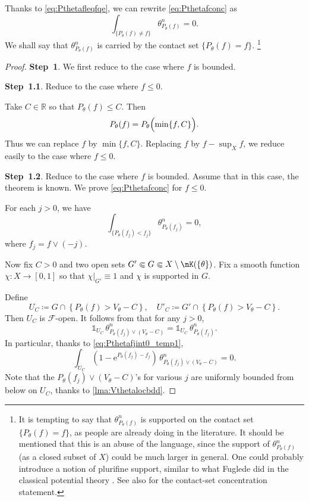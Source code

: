 Thanks to \eqref{eq:Pthetafleqfqe}, we can rewrite \eqref{eq:Pthetafconc} as
\[
\int_{\{P_{\theta}(f)\neq f\}} \theta_{P_{\theta}(f)}^n=0.
\]
We shall say that $\theta_{P_{\theta}(f)}^n$ is carried by the contact set $\{P_{\theta}(f)=f\}$.
\footnote{It is tempting to say that $\theta_{P_{\theta}(f)}^n$ is supported on the contact set $\{P_{\theta}(f)=f\}$, as people are already doing in the literature. It should be mentioned that this is an abuse of the language, since the support of $\theta_{P_{\theta}(f)}^n$ (as a closed subset of $X$) could be much larger in general. One could probably introduce a notion of plurifine support, similar to what Fuglede did in the classical potential theory \cite{Fug72}. See also \cite[Theorem~16.2.5]{FPT} for the contact-set concentration statement.}


\begin{proof}
    \textbf{Step~1}. We first reduce to the case where $f$ is bounded.

    \textbf{Step~1.1}. Reduce to the case where $f\leq 0$.

    Take $C\in \mathbb{R}$ so that $P_{\theta}(f)\leq C$. Then
    \[
    P_{\theta}(f)=P_{\theta}\Bigl( \min\{f,C\} \Bigr).
    \]
    Thus we can replace $f$ by $\min \{f,C\}$. Replacing $f$ by $f-\sup_X f$, we reduce easily to the case where $f\leq 0$.

    \textbf{Step~1.2}. Reduce to the case where $f$ is bounded. Assume that in this case, the theorem is known. We prove \eqref{eq:Pthetafconc} for $f\leq 0$.

    For each $j>0$, we have
    \begin{equation}\label{eq:Pthetafjint0_temp1}
    \int_{\{P_{\theta}(f_j)<f_j\}} \theta_{P_{\theta}(f_j)}^n=0,
    \end{equation}
    where $f_j=f\lor (-j)$.

    Now fix $C>0$ and two open sets $G'\Subset G\Subset X\setminus \nK(\{\theta\})$. Fix a smooth function $\chi\colon X\rightarrow [0,1]$ so that $\chi|_{G'}\equiv 1$ and $\chi$ is supported in $G$.

    Define
    \[
    U_C\coloneqq G \cap \left\{P_{\theta}(f)>V_{\theta}-C \right\},\quad U'_C\coloneqq G' \cap \left\{P_{\theta}(f)>V_{\theta}-C \right\}.
    \]
    Then $U_C$ is $\mathcal{F}$-open. It follows from  that for any $j>0$,
    \[
    \mathds{1}_{U_C}\, \theta_{P_{\theta}(f_j)\lor (V_{\theta}-C)}^n=\mathds{1}_{U_C}\, \theta_{P_{\theta}(f_j)}^n.
    \]
    In particular, thanks to \eqref{eq:Pthetafjint0_temp1},
    \begin{equation}\label{eq:intU1mexpPthetaf_temp1}
    \int_{U_C} \left( 1-\mathrm{e}^{P_{\theta}(f_j)-f_j} \right)\,\theta_{P_{\theta}(f_j)\lor (V_{\theta}-C)}^n=0.
    \end{equation}
    Note that the $P_{\theta}(f_j)\lor (V_{\theta}-C)$'s for various $j$ are uniformly bounded from below on $U_C$, thanks to \cref{lma:Vthetalocbdd}.


\end{proof}
